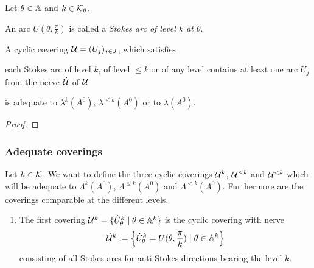 \begin{prop}
  Let $\theta\in\mathbb{A}$ and $k\in\mathcal{K}_\theta$.
  \begin{s-defn}
    An arc $U(\theta,\frac{\pi}{k})$ is called a \emph{Stokes arc of level $k$
    at $\theta$}.
  \end{s-defn}
  A cyclic covering $\mathcal{U}=(U_j)_{j\in J}$, which satisfies
  \begin{einr}
    each Stokes arc of level $k$, of level $\leq k$ or of any level
    contains at least one arc $\dot U_j$ from the nerve $\dot{\mathcal{U}}$ of $\mathcal{U}$
  \end{einr}
  is adequate to $\lambda^k(A^0)$, $\lambda^{\leq k}(A^0)$ or to $\lambda(A^0)$.
\end{prop}
\begin{proof}
  \TODO{}
\end{proof}

\subsubsection{Adequate coverings}
Let $k\in\mathcal{K}$.
We want to define the three cyclic coverings $\mathcal{U}^{k}$, $\mathcal{U}^{\leq k}$ and
$\mathcal{U}^{<k}$ which will be adequate to $\Lambda^k(A^0)$, $\Lambda^{\leq k}(A^0)$
and $\Lambda^{<k}(A^0)$. Furthermore are the coverings comparable at the
different levels.

\begin{enumerate}
  \item The first covering $\mathcal{U}^{k}=\{\dot U_\theta^k\mid\theta\in\mathbb{A}^k\}$
    is the cyclic covering with nerve
    \[
      \dot{\mathcal{U}}^k:=
      \left\{\dot U_\theta^k=U(\theta,\frac{\pi}{k})\mid\theta\in\mathbb{A}^k\right\}
    \]
    consisting of all Stokes arcs for anti-Stokes directions bearing the level
    $k$.
\end{enumerate}

